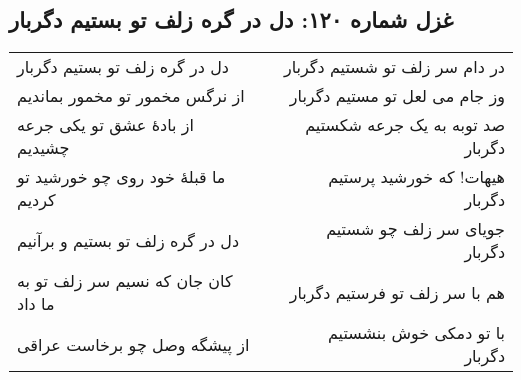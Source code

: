 \begin{center}
\section*{غزل شماره ۱۲۰: دل در گره زلف تو بستیم دگربار}
\label{sec:120}
\begin{longtable}{l p{0.5cm} r}
دل در گره زلف تو بستیم دگربار
&&
در دام سر زلف تو شستیم دگربار
\\
از نرگس مخمور تو مخمور بماندیم
&&
وز جام می لعل تو مستیم دگربار
\\
از بادهٔ عشق تو یکی جرعه چشیدیم
&&
صد توبه به یک جرعه شکستیم دگربار
\\
ما قبلهٔ خود روی چو خورشید تو کردیم
&&
هیهات! که خورشید پرستیم دگربار
\\
دل در گره زلف تو بستیم و برآنیم
&&
جویای سر زلف چو شستیم دگربار
\\
کان جان که نسیم سر زلف تو به ما داد
&&
هم با سر زلف تو فرستیم دگربار
\\
از پیشگه وصل چو برخاست عراقی
&&
با تو دمکی خوش بنشستیم دگربار
\\
\end{longtable}
\end{center}

